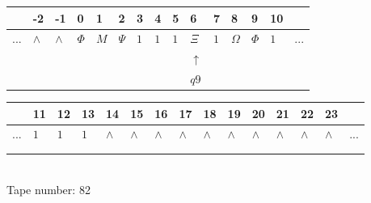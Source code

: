 \documentclass[11pt]{article}
\begin{document}
\begin{table}[H]
\centering
\begin{tabular}{lllllllllllllll}
 & -2 & -1 & 0 & 1 & 2 & 3 & 4 & 5 & 6 & 7 & 8 & 9 & 10 & \\
\hline
$...$ & \multicolumn{1}{|l|}{$\wedge$} & \multicolumn{1}{|l|}{$\wedge$} & \multicolumn{1}{|l|}{$\Phi$} & \multicolumn{1}{|l|}{$M$} & \multicolumn{1}{|l|}{$\Psi$} & \multicolumn{1}{|l|}{$1$} & \multicolumn{1}{|l|}{$1$} & \multicolumn{1}{|l|}{$1$} & \multicolumn{1}{|l|}{$\Xi$} & \multicolumn{1}{|l|}{$1$} & \multicolumn{1}{|l|}{$\Omega$} & \multicolumn{1}{|l|}{$\Phi$} & \multicolumn{1}{|l|}{$1$} & $...$\\
\hline
&  &  &  &  &  &  &  &  & $\uparrow$ &  &  &  &  &  \\
&  &  &  &  &  &  &  &  & $ q9 $ &  &  &  &  &  \\
\end{tabular}
\begin{tabular}{lllllllllllllll}
 & 11 & 12 & 13 & 14 & 15 & 16 & 17 & 18 & 19 & 20 & 21 & 22 & 23 & \\
\hline
$...$ & \multicolumn{1}{|l|}{$1$} & \multicolumn{1}{|l|}{$1$} & \multicolumn{1}{|l|}{$1$} & \multicolumn{1}{|l|}{$\wedge$} & \multicolumn{1}{|l|}{$\wedge$} & \multicolumn{1}{|l|}{$\wedge$} & \multicolumn{1}{|l|}{$\wedge$} & \multicolumn{1}{|l|}{$\wedge$} & \multicolumn{1}{|l|}{$\wedge$} & \multicolumn{1}{|l|}{$\wedge$} & \multicolumn{1}{|l|}{$\wedge$} & \multicolumn{1}{|l|}{$\wedge$} & \multicolumn{1}{|l|}{$\wedge$} & $...$\\
\hline
&  &  &  &  &  &  &  &  &  &  &  &  &  &  \\
&  &  &  &  &  &  &  &  &  &  &  &  &  &  \\
\end{tabular}
\\
Tape number: 82
\noindent\makebox[\linewidth]{\hdashrule{\textwidth}{1pt}{1pt}}\end{table}
\end{document}

